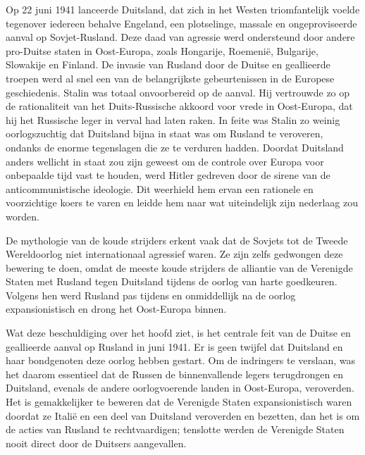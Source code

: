 \documentclass[
  a5paper,
  smalldemyvopaper,10pt,twoside,onecolumn,openright,extrafontsizes,hidelinks]{memoir}
\begin{document}
Op 22 juni 1941 lanceerde Duitsland, dat zich in het Westen
triomfantelijk voelde tegenover iedereen behalve Engeland, een
plotselinge, massale en ongeproviseerde aanval op Sovjet-Rusland. Deze
daad van agressie werd ondersteund door andere pro-Duitse staten in
Oost-Europa, zoals Hongarije, Roemenië, Bulgarije, Slowakije en Finland.
De invasie van Rusland door de Duitse en geallieerde troepen werd al
snel een van de belangrijkste gebeurtenissen in de Europese
geschiedenis. Stalin was totaal onvoorbereid op de aanval. Hij
vertrouwde zo op de rationaliteit van het Duits-Russische akkoord voor
vrede in Oost-Europa, dat hij het Russische leger in verval had laten
raken. In feite was Stalin zo weinig oorlogszuchtig dat Duitsland bijna
in staat was om Rusland te veroveren, ondanks de enorme tegenslagen die
ze te verduren hadden. Doordat Duitsland anders wellicht in staat zou
zijn geweest om de controle over Europa voor onbepaalde tijd vast te
houden, werd Hitler gedreven door de sirene van de anticommunistische
ideologie. Dit weerhield hem ervan een rationele en voorzichtige koers
te varen en leidde hem naar wat uiteindelijk zijn nederlaag zou worden.

De mythologie van de koude strijders erkent vaak dat de Sovjets tot de
Tweede Wereldoorlog niet internationaal agressief waren. Ze zijn zelfs
gedwongen deze bewering te doen, omdat de meeste koude strijders de
alliantie van de Verenigde Staten met Rusland tegen Duitsland tijdens de
oorlog van harte goedkeuren. Volgens hen werd Rusland pas tijdens en
onmiddellijk na de oorlog expansionistisch en drong het Oost-Europa
binnen.

Wat deze beschuldiging over het hoofd ziet, is het centrale feit van de
Duitse en geallieerde aanval op Rusland in juni 1941. Er is geen twijfel
dat Duitsland en haar bondgenoten deze oorlog hebben gestart. Om de
indringers te verslaan, was het daarom essentieel dat de Russen de
binnenvallende legers terugdrongen en Duitsland, evenals de andere
oorlogvoerende landen in Oost-Europa, veroverden. Het is gemakkelijker
te beweren dat de Verenigde Staten expansionistisch waren doordat ze
Italië en een deel van Duitsland veroverden en bezetten, dan het is om
de acties van Rusland te rechtvaardigen; tenslotte werden de Verenigde
Staten nooit direct door de Duitsers aangevallen.
\end{document}
